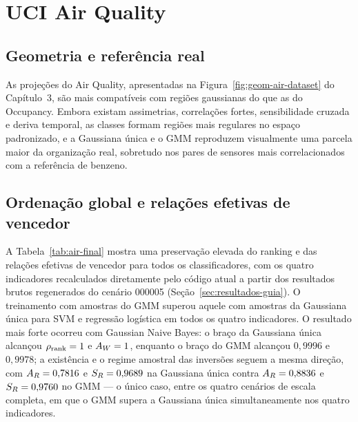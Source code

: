 \section{UCI Air Quality}

\subsection{Geometria e referência real}

As projeções do Air Quality, apresentadas na Figura~\ref{fig:geom-air-dataset} do Capítulo~3, são mais compatíveis com regiões gaussianas do que as do Occupancy. Embora existam assimetrias, correlações fortes, sensibilidade cruzada e deriva temporal, as classes formam regiões mais regulares no espaço padronizado, e a Gaussiana única e o GMM reproduzem visualmente uma parcela maior da organização real, sobretudo nos pares de sensores mais correlacionados com a referência de benzeno.

\subsection{Ordenação global e relações efetivas de vencedor}

A Tabela~\ref{tab:air-final} mostra uma preservação elevada do ranking e das relações efetivas de vencedor para todos os classificadores, com os quatro indicadores recalculados diretamente pelo código atual a partir dos resultados brutos regenerados do cenário 000005 (Seção~\ref{sec:resultados-guia}). O treinamento com amostras do GMM superou aquele com amostras da Gaussiana única para SVM e regressão logística em todos os quatro indicadores. O resultado mais forte ocorreu com Gaussian Naive Bayes: o braço da Gaussiana única alcançou $\rho_{\mathrm{rank}}=1$ e $A_W=1$, enquanto o braço do GMM alcançou $0{,}9996$ e $0{,}9978$; a existência e o regime amostral das inversões seguem a mesma direção, com $A_R=0{,}7816$ e $S_R=0{,}9689$ na Gaussiana única contra $A_R=0{,}8836$ e $S_R=0{,}9760$ no GMM --- o único caso, entre os quatro cenários de escala completa, em que o GMM supera a Gaussiana única simultaneamente nos quatro indicadores.

